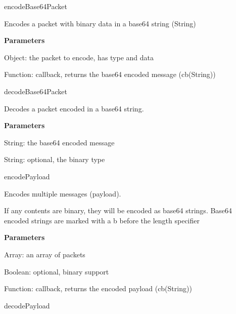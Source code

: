 \begin{DoxyItemize}
\begin{DoxyItemize}
\end{DoxyItemize}
\item {\ttfamily encode\+Base64\+Packet}
\begin{DoxyItemize}
\item Encodes a packet with binary data in a base64 string ({\ttfamily String})
\item {\bfseries Parameters}
\begin{DoxyItemize}
\item {\ttfamily Object}\+: the packet to encode, has {\ttfamily type} and {\ttfamily data}
\item {\ttfamily Function}\+: callback, returns the base64 encoded message ({\ttfamily cb(\+String)})
\end{DoxyItemize}
\end{DoxyItemize}
\item {\ttfamily decode\+Base64\+Packet}
\begin{DoxyItemize}
\item Decodes a packet encoded in a base64 string.
\item {\bfseries Parameters}
\begin{DoxyItemize}
\item {\ttfamily String}\+: the base64 encoded message
\item {\ttfamily String}\+: optional, the binary type
\end{DoxyItemize}
\end{DoxyItemize}
\item {\ttfamily encode\+Payload}
\begin{DoxyItemize}
\item Encodes multiple messages (payload).
\item If any contents are binary, they will be encoded as base64 strings. Base64 encoded strings are marked with a b before the length specifier
\item {\bfseries Parameters}
\begin{DoxyItemize}
\item {\ttfamily Array}\+: an array of packets
\item {\ttfamily Boolean}\+: optional, binary support
\item {\ttfamily Function}\+: callback, returns the encoded payload ({\ttfamily cb(\+String)})
\end{DoxyItemize}
\end{DoxyItemize}
\item {\ttfamily decode\+Payload}
\begin{DoxyItemize}

\end{DoxyItemize}
\end{DoxyItemize}
